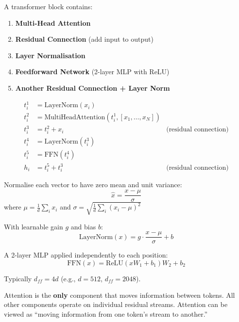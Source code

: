 \begin{defbox}
A transformer block contains:
\begin{enumerate}
  \item \textbf{Multi-Head Attention}
  \item \textbf{Residual Connection} (add input to output)
  \item \textbf{Layer Normalisation}
  \item \textbf{Feedforward Network} (2-layer MLP with ReLU)
  \item \textbf{Another Residual Connection + Layer Norm}
\end{enumerate}
\end{defbox}

\begin{defbox}
\begin{align*}
t^1_i &= \text{LayerNorm}(x_i) \\
t^2_i &= \text{MultiHeadAttention}(t^1_i, [x_1, \ldots, x_N]) \\
t^3_i &= t^2_i + x_i & \text{(residual connection)} \\
t^4_i &= \text{LayerNorm}(t^3_i) \\
t^5_i &= \text{FFN}(t^4_i) \\
h_i &= t^5_i + t^3_i & \text{(residual connection)}
\end{align*}
\end{defbox}

\begin{defbox}
Normalise each vector to have zero mean and unit variance:
\[
\hat{x} = \frac{x - \mu}{\sigma}
\]
where $\mu = \frac{1}{d}\sum_i x_i$ and $\sigma = \sqrt{\frac{1}{d}\sum_i (x_i - \mu)^2}$

With learnable gain $g$ and bias $b$:
\[
\text{LayerNorm}(x) = g \cdot \frac{x - \mu}{\sigma} + b
\]
\end{defbox}

\begin{defbox}
A 2-layer MLP applied independently to each position:
\[
\text{FFN}(x) = \text{ReLU}(x W_1 + b_1) W_2 + b_2
\]

Typically $d_{ff} = 4d$ (e.g., $d = 512$, $d_{ff} = 2048$).
\end{defbox}

\begin{tipbox}
Attention is the \textbf{only} component that moves information between tokens. All other components operate on individual residual streams. Attention can be viewed as ``moving information from one token's stream to another.''
\end{tipbox}


